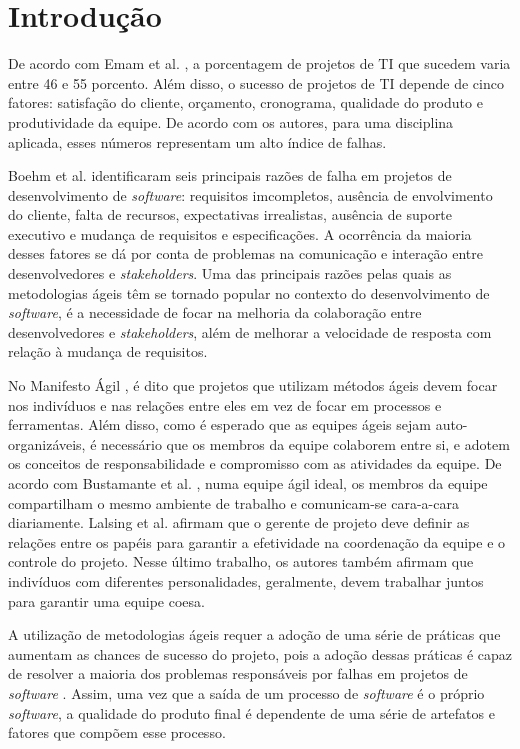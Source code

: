 \chapter{Introdução}
\label{introducao}

De acordo com Emam et al. \cite{emam}, a porcentagem de projetos de TI que sucedem varia entre 46 e 55 porcento. Além disso, o sucesso de projetos de TI depende de cinco fatores: satisfação do cliente, orçamento, cronograma, qualidade do produto e produtividade da equipe. De acordo com os autores, para uma disciplina aplicada, esses números representam um alto índice de falhas.

Boehm et al. \cite{boehm} identificaram seis principais razões de falha em projetos de desenvolvimento de \textit{software}: requisitos imcompletos, ausência de envolvimento do cliente, falta de recursos, expectativas irrealistas, ausência de suporte executivo e mudança de requisitos e especificações. A ocorrência da maioria desses fatores se dá por conta de problemas na comunicação e interação entre desenvolvedores e \textit{stakeholders}. Uma das principais razões pelas quais as metodologias ágeis têm se tornado popular no contexto do desenvolvimento de \textit{software}, é a necessidade de focar na melhoria da colaboração entre desenvolvedores e \textit{stakeholders}, além de melhorar a velocidade de resposta com relação à mudança de requisitos.

No Manifesto Ágil \cite{manifesto}, é dito que projetos que utilizam métodos ágeis devem focar nos indivíduos e nas relações entre eles em vez de focar em processos e ferramentas. Além disso, como é esperado que as equipes ágeis sejam auto-organizáveis, é necessário que os membros da equipe colaborem entre si, e adotem os conceitos de responsabilidade e compromisso com as atividades da equipe. De acordo com Bustamante et al. \cite{bustamante}, numa equipe ágil ideal, os membros da equipe compartilham o mesmo ambiente de trabalho e comunicam-se cara-a-cara diariamente. Lalsing et al. \cite{lalsing} afirmam que o gerente de projeto deve definir as relações entre os papéis para garantir a efetividade na coordenação da equipe e o controle do projeto. Nesse último trabalho, os autores também afirmam que indivíduos com diferentes personalidades, geralmente, devem trabalhar juntos para garantir uma equipe coesa.

A utilização de metodologias ágeis requer a adoção de uma série de práticas que aumentam as chances de sucesso do projeto, pois a adoção dessas práticas é capaz de resolver a maioria dos problemas responsáveis por falhas em projetos de \textit{software} \cite{boehm}. Assim, uma vez que a saída de um processo de \textit{software} é o próprio \textit{software}, a qualidade do produto final é dependente de uma série de artefatos e fatores que compõem esse processo.

